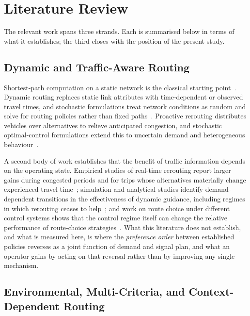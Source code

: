 
\section{Literature Review}

The relevant work spans three strands. Each is summarised below in terms of what it
establishes; the third closes with the position of the present study.

\subsection{Dynamic and Traffic-Aware Routing}

Shortest-path computation on a static network is the classical starting
point~\cite{dijkstra1959note}. Dynamic routing replaces static link attributes with
time-dependent or observed travel times, and stochastic formulations treat network
conditions as random and solve for routing policies rather than fixed
paths~\cite{gao2006optimal,levering2021framework}. Proactive rerouting distributes
vehicles over alternatives to relieve anticipated congestion, and stochastic
optimal-control formulations extend this to uncertain demand and heterogeneous
behaviour~\cite{pan2013proactive,pi2017stochastic}.

A second body of work establishes that the benefit of traffic information depends on the
operating state. Empirical studies of real-time rerouting report larger gains during
congested periods and for trips whose alternatives materially change experienced travel
time~\cite{falek2021reroute}; simulation and analytical studies identify demand-dependent
transitions in the effectiveness of dynamic guidance, including regimes in which
rerouting ceases to help~\cite{novikov2018dynamic,routing2026phase,chen2025detour}; and
work on route choice under different control systems shows that the control regime itself
can change the relative performance of route-choice
strategies~\cite{xie2014unified,papageorgiou2003review}. What this literature does not
establish, and what is measured here, is where the \emph{preference order} between
established policies reverses as a joint function of demand and signal plan, and what an
operator gains by acting on that reversal rather than by improving any single mechanism.

\subsection{Environmental, Multi-Criteria, and Context-Dependent Routing}

